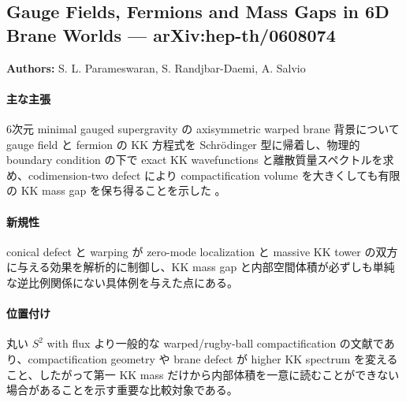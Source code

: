 \subsection{Gauge Fields, Fermions and Mass Gaps in 6D Brane Worlds --- arXiv:hep-th/0608074}

\textbf{Authors:} S. L. Parameswaran, S. Randjbar-Daemi, A. Salvio

\paragraph{主な主張}
6次元 minimal gauged supergravity の axisymmetric warped brane 背景について gauge field と fermion の KK 方程式を Schrödinger 型に帰着し、物理的 boundary condition の下で exact KK wavefunctions と離散質量スペクトルを求め、codimension-two defect により compactification volume を大きくしても有限の KK mass gap を保ち得ることを示した \cite{Parameswaran:2006SixDBrane}。

\paragraph{新規性}
conical defect と warping が zero-mode localization と massive KK tower の双方に与える効果を解析的に制御し、KK mass gap と内部空間体積が必ずしも単純な逆比例関係にない具体例を与えた点にある。

\paragraph{位置付け}
丸い $S^2$ with flux より一般的な warped/rugby-ball compactification の文献であり、compactification geometry や brane defect が higher KK spectrum を変えること、したがって第一 KK mass だけから内部体積を一意に読むことができない場合があることを示す重要な比較対象である。